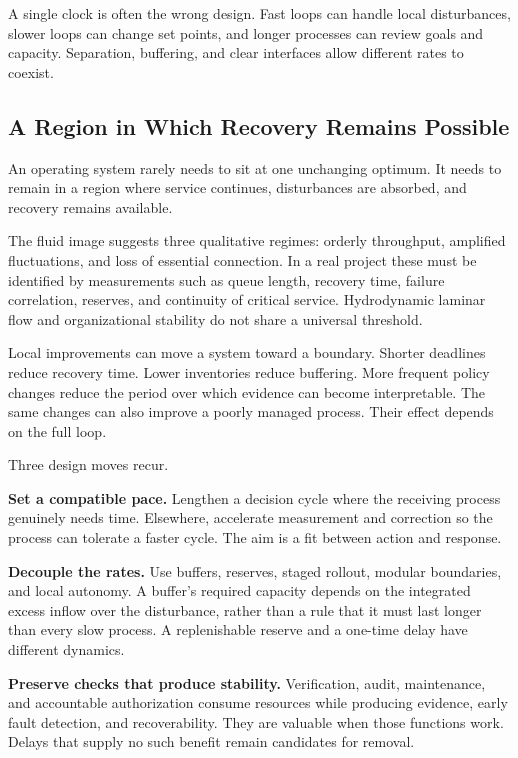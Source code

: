 A single clock is often the wrong design. Fast loops can handle local disturbances, slower loops can change set points, and longer processes can review goals and capacity. Separation, buffering, and clear interfaces allow different rates to coexist.

\subsection{A Region in Which Recovery Remains Possible}

An operating system rarely needs to sit at one unchanging optimum. It needs to remain in a region where service continues, disturbances are absorbed, and recovery remains available.

The fluid image suggests three qualitative regimes: orderly throughput, amplified fluctuations, and loss of essential connection. In a real project these must be identified by measurements such as queue length, recovery time, failure correlation, reserves, and continuity of critical service. Hydrodynamic laminar flow and organizational stability do not share a universal threshold.

Local improvements can move a system toward a boundary. Shorter deadlines reduce recovery time. Lower inventories reduce buffering. More frequent policy changes reduce the period over which evidence can become interpretable. The same changes can also improve a poorly managed process. Their effect depends on the full loop.

Three design moves recur.

\textbf{Set a compatible pace.} Lengthen a decision cycle where the receiving process genuinely needs time. Elsewhere, accelerate measurement and correction so the process can tolerate a faster cycle. The aim is a fit between action and response.

\textbf{Decouple the rates.} Use buffers, reserves, staged rollout, modular boundaries, and local autonomy. A buffer's required capacity depends on the integrated excess inflow over the disturbance, rather than a rule that it must last longer than every slow process. A replenishable reserve and a one-time delay have different dynamics.

\textbf{Preserve checks that produce stability.} Verification, audit, maintenance, and accountable authorization consume resources while producing evidence, early fault detection, and recoverability. They are valuable when those functions work. Delays that supply no such benefit remain candidates for removal.

